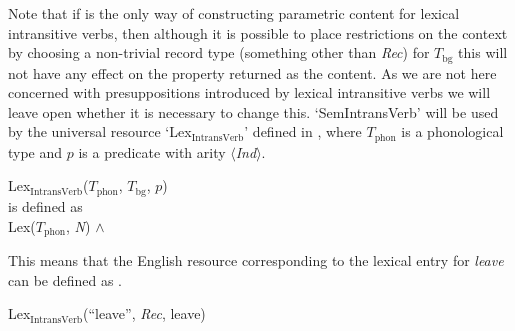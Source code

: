  
Note that if \preveg{} is the only way of constructing parametric content for
lexical intransitive verbs, then although it is possible to place
restrictions on the context by choosing a non-trivial record type
(something other than \textit{Rec}) for $T_{\mathrm{bg}}$ this will
not have any effect on the property returned as the content.  As we
are not here concerned with presuppositions introduced by lexical
intransitive verbs we will leave open whether it is necessary to
change this.  `SemIntransVerb' will be used by the universal resource
`Lex$_{\mathrm{IntransVerb}}$' defined in \nexteg{}, where
$T_{\mathrm{phon}}$ is a phonological type and $p$ is a predicate with
arity $\langle$\textit{Ind}$\rangle$.
\begin{ex} 
Lex$_{\mathrm{IntransVerb}}$($T_{\mathrm{phon}}$, $T_{\mathrm{bg}}$, $p$)\\
is defined as \\
Lex($T_{\mathrm{phon}}$, \textit{N}) \d{$\wedge$}
\end{ex} 
This means that the English resource corresponding to the lexical
entry for \textit{leave} can be defined as \nexteg{}.
\begin{ex} 
Lex$_{\mathrm{IntransVerb}}$(``leave'', \textit{Rec}, leave) 
\end{ex} 
       

